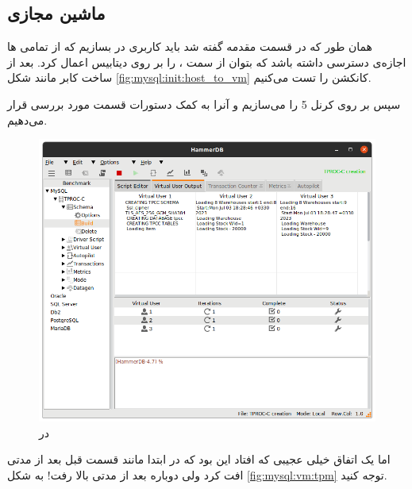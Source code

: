 \subsection{ماشین مجازی}
همان طور که در قسمت مقدمه گفته شد باید کاربری در
بسازیم که از تمامی
ها
اجازه‌ی دسترسی داشته باشد که بتوان از سمت
، 
را بر روی دیتابیس اعمال کرد. بعد از ساخت کابر مانند شکل
\ref{fig:mysql:init:host_to_vm}
کانکشن را تست می‌کنیم.

سپس بر روی کرنل 5
را می‌سازیم و آنرا به کمک دستورات قسمت
مورد بررسی قرار می‌دهیم.
\begin{figure}[H]
    \centering
    \includegraphics[scale=0.5]{pictures/mysql/vm/schema.png}
    \caption{ در }
    \label{fig:mysql:vm:schema}
\end{figure}
اما یک اتفاق خیلی عجیبی که افتاد این بود که در ابتدا مانند قسمت قبل
بعد از مدتی افت کرد ولی دوباره بعد از مدتی بالا رفت! به شکل
\ref{fig:mysql:vm:tpm}
توجه کنید.
